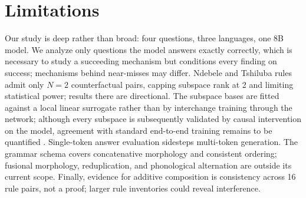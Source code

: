 \section*{Limitations}
\label{sec:limitations}

Our study is deep rather than broad: four questions, three languages, one
8B model. We analyze only questions the model answers exactly correctly,
which is necessary to study a succeeding mechanism but conditions every
finding on success; mechanisms behind near-misses may differ. Ndebele and
Tshiluba rules admit only $N{=}2$ counterfactual pairs, capping subspace
rank at 2 and limiting statistical power; results there are directional.
The subspace bases are fitted against a local linear surrogate rather than
by interchange training through the network; although every subspace is
subsequently validated by causal intervention on the model, agreement with
standard end-to-end training remains to be quantified
. Single-token answer
evaluation sidesteps multi-token generation. The grammar schema covers
concatenative morphology and consistent ordering; fusional morphology,
reduplication, and phonological alternation are outside its current scope.
Finally, evidence for additive composition is consistency across 16 rule
pairs, not a proof; larger rule inventories could reveal interference.
